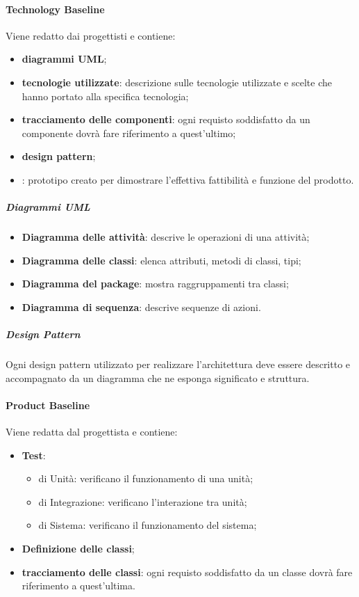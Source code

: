     \paragraph{Technology Baseline} \hfill \break
    Viene redatto dai progettisti e contiene:
    \begin{itemize}
      \item \textbf{diagrammi UML};
      \item \textbf{tecnologie utilizzate}: descrizione sulle tecnologie utilizzate e scelte che hanno portato alla specifica tecnologia;
      \item \textbf{tracciamento delle componenti}: ogni requisto soddisfatto da un componente dovrà fare riferimento a quest'ultimo;
      \item \textbf{design pattern};
      \item \textbf{}: prototipo creato per dimostrare l'effettiva fattibilità e funzione del prodotto.
    \end{itemize}
      \subparagraph{Diagrammi UML} 
      \begin{itemize}
        \item \textbf{Diagramma delle attività}: descrive le operazioni di una attività;
        \item \textbf{Diagramma delle classi}: elenca attributi, metodi di classi, tipi; 
        \item \textbf{Diagramma del package}: mostra raggruppamenti tra classi;
        \item \textbf{Diagramma di sequenza}: descrive sequenze di azioni.
      \end{itemize}
         
      \subparagraph{Design Pattern} \hfill \break
      Ogni design pattern utilizzato per realizzare l'architettura deve essere descritto e accompagnato da un diagramma che ne esponga significato e struttura.

    \paragraph{Product Baseline} \hfill \break
    Viene redatta dal progettista e contiene:
    \begin{itemize}
      \item \textbf{Test}:
      \begin{itemize}
        \item di Unità: verificano il funzionamento di una unità;
        \item di Integrazione: verificano l'interazione tra unità;
        \item di Sistema: verificano il funzionamento del sistema;
      \end{itemize}
      \item \textbf{Definizione delle classi};
      \item \textbf{tracciamento delle classi}: ogni requisto soddisfatto da un classe dovrà fare riferimento a quest'ultima.
      
    \end{itemize}

